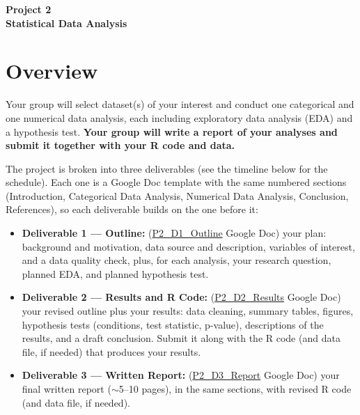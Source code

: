 \documentclass[12pt]{article}
\begin{document}
\begin{center}
\textbf{\Large Project 2 \\  Statistical Data Analysis }
\end{center}


\section*{Overview}
Your group will select dataset(s) of your interest and conduct one categorical and one numerical data analysis, each including exploratory data analysis (EDA) and a hypothesis test.
\textbf{Your group will write a report of your analyses and submit it together with your R code and data.}

\vspace{6pt}
The project is broken into three deliverables (see the timeline below for the schedule). Each one is a Google Doc template with the same numbered sections (Introduction, Categorical Data Analysis, Numerical Data Analysis, Conclusion, References), so each deliverable builds on the one before it:
\begin{itemize}
    \item \textbf{Deliverable 1 --- Outline:} (\href{https://docs.google.com/document/d/1J5nZ17STPfx3xI3VadGgF2XQOvTIQxo3MpW34h-n1bU/edit?usp=sharing}{P2\_D1\_Outline} Google Doc) your plan: background and motivation, data source and description, variables of interest, and a data quality check, plus, for each analysis, your research question, planned EDA, and planned hypothesis test.
    \item \textbf{Deliverable 2 --- Results and R Code:} (\href{https://docs.google.com/document/d/1H2uHoyaKZ9WlIEoHcfATuVc-I91VaTd27rTGJ7s2Lc0/edit?usp=sharing}{P2\_D2\_Results} Google Doc) your revised outline plus your results: data cleaning, summary tables, figures, hypothesis tests (conditions, test statistic, p-value), descriptions of the results, and a draft conclusion. Submit it along with the R code (and data file, if needed) that produces your results.
    \item \textbf{Deliverable 3 --- Written Report:} (\href{https://docs.google.com/document/d/1dahrvQrpxZyPi0YqcYnxPIC8nmBJCwZ15rkvok-DAS8/edit?usp=sharing}{P2\_D3\_Report} Google Doc) your final written report ($\sim$5--10 pages), in the same sections, with revised R code (and data file, if needed).
\end{itemize}
\end{document}
